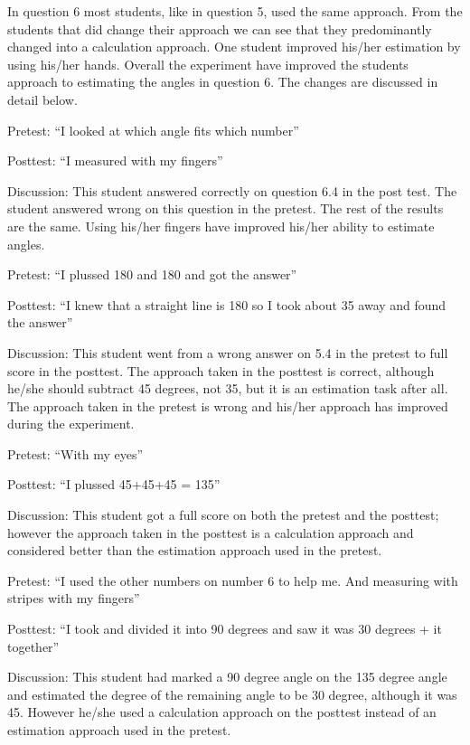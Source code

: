 \bigskip\noindent
In question 6 most students, like in question 5, used the same approach. From the students that did change their approach we can see that they predominantly changed into a calculation approach. One student improved his/her estimation by using his/her hands. Overall the experiment have improved the students approach to estimating the angles in question 6. The changes are discussed in detail below. 

\bigskip\noindent
Pretest: ``I looked at which angle fits which number''
\par\noindent Posttest: ``I measured with my fingers''
\par\noindent Discussion: This student answered correctly on question 6.4 in the post test. The student answered wrong on this question in the pretest. The rest of the results are the same. Using his/her fingers have improved his/her ability to estimate angles. 

\bigskip\noindent
Pretest: ``I plussed 180 and 180 and got the answer''
\par\noindent Posttest: ``I knew that a straight line is 180 so I took about 35 away and found the answer''
\par\noindent Discussion: This student went from a wrong answer on 5.4 in the pretest to full score in the posttest. The approach taken in the posttest is correct, although he/she should subtract 45 degrees, not 35, but it is an estimation task after all. The approach taken in the pretest is wrong and his/her approach has improved during the experiment.

\bigskip\noindent
Pretest: ``With my eyes''
\par\noindent Posttest: ``I plussed 45+45+45 = 135''
\par\noindent Discussion: This student got a full score on both the pretest and the posttest; however the approach taken in the posttest is a calculation approach and considered better than the estimation approach used in the pretest.

\bigskip\noindent
Pretest: ``I used the other numbers on number 6 to help me. And measuring with stripes with my fingers''
\par\noindent Posttest: ``I took and divided it into 90 degrees and saw it was 30 degrees + it together''
\par\noindent Discussion: This student had marked a 90 degree angle on the 135 degree angle and estimated the degree of the remaining angle to be 30 degree, although it was 45. However he/she used a calculation approach on the posttest instead of an estimation approach used in the pretest.


